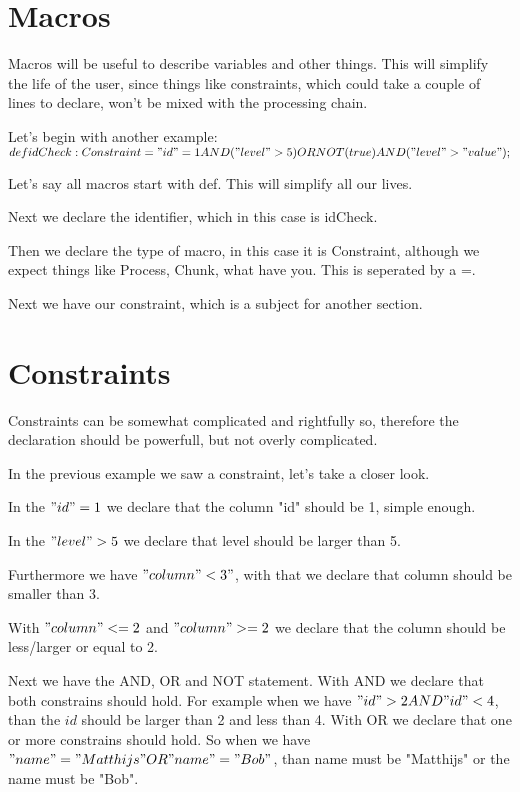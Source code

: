 \documentclass[a4paper]{article}
\begin{document}
\section{Macros}
Macros will be useful to describe variables and other things. This will simplify the life of the user, since things like constraints, which could take a couple of lines to declare, won't be mixed with the processing chain.

Let's begin with another example: \\

$def idCheck : Constraint = "id" = 1 AND ("level" > 5) OR NOT(true) AND ("level" > "value");$

Let's say all macros start with def. This will simplify all our lives.

Next we declare the identifier, which in this case is idCheck.

Then we declare the type of macro, in this case it is Constraint, although we expect things like Process, Chunk, what have you. This is seperated by a =.

Next we have our constraint, which is a subject for another section.

\section{Constraints}
Constraints can be somewhat complicated and rightfully so, therefore the declaration should be powerfull, but not overly complicated.

In the previous example we saw a constraint, let's take a closer look.

In the $"id" = 1$ we declare that the column "id" should be 1, simple enough. 

In the $"level" > 5$ we declare that level should be larger than 5. 

Furthermore we have $"column" < 3"$, with that we declare that column should be smaller than 3.

With $"column" <= 2$ and $"column" >= 2$ we declare that the column should be less/larger or equal to 2.

Next we have the AND, OR and NOT statement. With AND we declare that both constrains should hold. For example when we have $"id" > 2 AND "id" < 4$, than the $id$ should be larger than 2 and less than 4.
With OR we declare that one or more constrains should hold. So when we have $"name" = "Matthijs" OR "name" = "Bob"$, than name must be "Matthijs" or the name must be "Bob".
\end{document}
